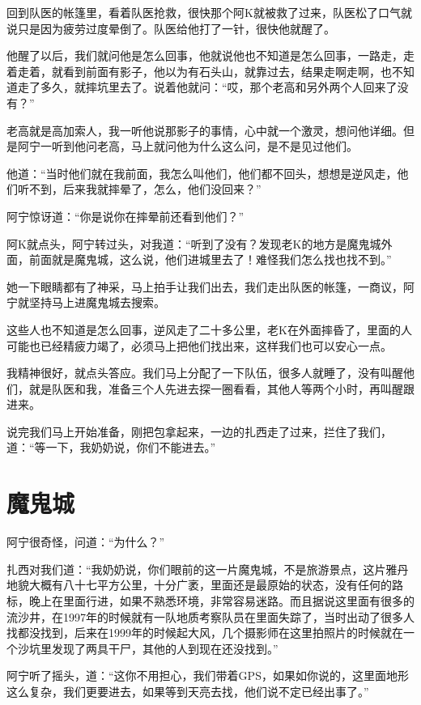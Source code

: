 回到队医的帐篷里，看着队医抢救，很快那个阿K就被救了过来，队医松了口气就说只是因为疲劳过度晕倒了。队医给他打了一针，很快他就醒了。

他醒了以后，我们就问他是怎么回事，他就说他也不知道是怎么回事，一路走，走着走着，就看到前面有影子，他以为有石头山，就靠过去，结果走啊走啊，也不知道走了多久，就摔坑里去了。说着他就问：“哎，那个老高和另外两个人回来了没有？”

老高就是高加索人，我一听他说那影子的事情，心中就一个激灵，想问他详细。但是阿宁一听到他问老高，马上就问他为什么这么问，是不是见过他们。

他道：“当时他们就在我前面，我怎么叫他们，他们都不回头，想想是逆风走，他们听不到，后来我就摔晕了，怎么，他们没回来？”

阿宁惊讶道：“你是说你在摔晕前还看到他们？”

阿K就点头，阿宁转过头，对我道：“听到了没有？发现老K的地方是魔鬼城外面，前面就是魔鬼城，这么说，他们进城里去了！难怪我们怎么找也找不到。”

她一下眼睛都有了神采，马上拍手让我们出去，我们走出队医的帐篷，一商议，阿宁就坚持马上进魔鬼城去搜索。

这些人也不知道是怎么回事，逆风走了二十多公里，老K在外面摔昏了，里面的人可能也已经精疲力竭了，必须马上把他们找出来，这样我们也可以安心一点。

我精神很好，就点头答应。我们马上分配了一下队伍，很多人就睡了，没有叫醒他们，就是队医和我，准备三个人先进去探一圈看看，其他人等两个小时，再叫醒跟进来。

说完我们马上开始准备，刚把包拿起来，一边的扎西走了过来，拦住了我们，道：“等一下，我奶奶说，你们不能进去。”

\chapter{魔鬼城}

阿宁很奇怪，问道：“为什么？”

扎西对我们道：“我奶奶说，你们眼前的这一片魔鬼城，不是旅游景点，这片雅丹地貌大概有八十七平方公里，十分广袤，里面还是最原始的状态，没有任何的路标，晚上在里面行进，如果不熟悉环境，非常容易迷路。而且据说这里面有很多的流沙井，在1997年的时候就有一队地质考察队员在里面失踪了，当时出动了很多人找都没找到，后来在1999年的时候起大风，几个摄影师在这里拍照片的时候就在一个沙坑里发现了两具干尸，其他的人到现在还没找到。”

阿宁听了摇头，道：“这你不用担心，我们带着GPS，如果如你说的，这里面地形这么复杂，我们更要进去，如果等到天亮去找，他们说不定已经出事了。”

